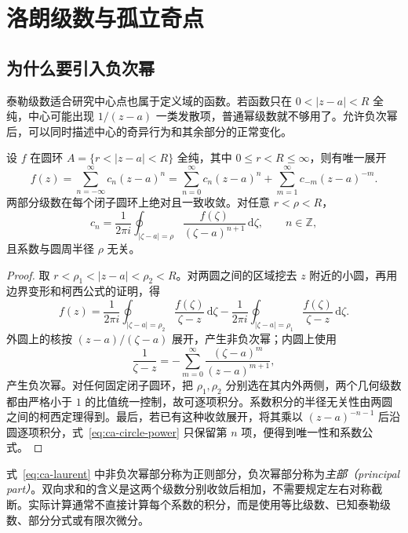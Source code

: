 \setcounter{chapter}{7} %
\chapter{洛朗级数与孤立奇点}
\label{chap:ca-laurent}

\section{为什么要引入负次幂}

泰勒级数适合研究中心点也属于定义域的函数。若函数只在 $0<|z-a|<R$ 全纯，中心可能出现 $1/(z-a)$ 一类发散项，普通幂级数就不够用了。允许负次幂后，可以同时描述中心的奇异行为和其余部分的正常变化。

\begin{theorem}[洛朗展开]
\label{thm:ca-laurent}
设 $f$ 在圆环 $A=\{r<|z-a|<R\}$ 全纯，其中 $0\le r<R\le\infty$，则有唯一展开
\begin{equation}
 f(z)=\sum_{n=-\infty}^{\infty}c_n(z-a)^n
 =\sum_{n=0}^{\infty}c_n(z-a)^n+\sum_{m=1}^{\infty}c_{-m}(z-a)^{-m}.
 \label{eq:ca-laurent}
\end{equation}
两部分级数在每个闭子圆环上绝对且一致收敛。对任意 $r<\rho<R$，
\begin{equation}
 c_n=\frac1{2\pi i}\oint_{|\zeta-a|=\rho}
 \frac{f(\zeta)}{(\zeta-a)^{n+1}}\,\mathrm d\zeta,
 \qquad n\in\mathbb Z,
 \label{eq:ca-laurent-coefficient}
\end{equation}
且系数与圆周半径 $\rho$ 无关。
\end{theorem}
\begin{proof}
取 $r<\rho_1<|z-a|<\rho_2<R$。对两圆之间的区域挖去 $z$ 附近的小圆，再用边界变形和柯西公式的证明，得
\[
 f(z)=\frac1{2\pi i}\oint_{|\zeta-a|=\rho_2}\frac{f(\zeta)}{\zeta-z}\,\mathrm d\zeta
 -\frac1{2\pi i}\oint_{|\zeta-a|=\rho_1}\frac{f(\zeta)}{\zeta-z}\,\mathrm d\zeta.
\]
外圆上的核按 $(z-a)/(\zeta-a)$ 展开，产生非负次幂；内圆上使用
\[
 \frac1{\zeta-z}=-\sum_{m=0}^\infty\frac{(\zeta-a)^m}{(z-a)^{m+1}},
\]
产生负次幂。对任何固定闭子圆环，把 $\rho_1,\rho_2$ 分别选在其内外两侧，两个几何级数都由严格小于 $1$ 的比值统一控制，故可逐项积分。系数积分的半径无关性由两圆之间的柯西定理得到。最后，若已有这种收敛展开，将其乘以 $(z-a)^{-n-1}$ 后沿圆逐项积分，式~\eqref{eq:ca-circle-power} 只保留第 $n$ 项，便得到唯一性和系数公式。
\end{proof}

式~\eqref{eq:ca-laurent} 中非负次幂部分称为正则部分，负次幂部分称为\emph{主部（principal part）}。双向求和的含义是这两个级数分别收敛后相加，不需要规定左右对称截断。实际计算通常不直接计算每个系数的积分，而是使用等比级数、已知泰勒级数、部分分式或有限次微分。

